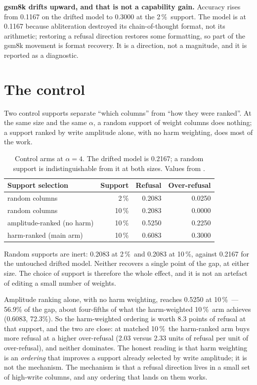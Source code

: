 \documentclass[11pt,a4paper]{article}
\newcommand{\file}[1]{\protect\path{#1}}
\newcommand{\pct}{\,\%}
\begin{document}
\textbf{gsm8k drifts upward, and that is not a capability gain.} Accuracy rises from 0.1167 on the drifted
model to 0.3000 at the 2\pct\ support. The model is at 0.1167 because abliteration destroyed its
chain-of-thought format, not its arithmetic; restoring a refusal direction restores some formatting, so
part of the gsm8k movement is format recovery. It is a direction, not a magnitude, and it is reported as a
diagnostic.

\section{The control}
\label{sec:control}

Two control supports separate ``which columns'' from ``how they were ranked''. At the same size and the
same $\alpha$, a random support of weight columns does nothing; a support ranked by write amplitude alone,
with no harm weighting, does most of the work.

\begin{table}[h]
\centering
\small
\caption{Control arms at $\alpha=4$. The drifted model is 0.2167; a random support is indistinguishable
from it at both sizes. Values from \file{results/p3c_blind.json}.}
\label{tab:control}
\begin{tabular}{@{}lrrr@{}}
\toprule
\textbf{Support selection} & \textbf{Support} & \textbf{Refusal} & \textbf{Over-refusal} \\
\midrule
random columns            & 2\pct  & 0.2083 & 0.0250 \\
random columns            & 10\pct & 0.2083 & 0.0000 \\
amplitude-ranked (no harm) & 10\pct & 0.5250 & 0.2250 \\
harm-ranked (main arm)     & 10\pct & 0.6083 & 0.3000 \\
\bottomrule
\end{tabular}
\end{table}

Random supports are inert: 0.2083 at 2\pct\ and 0.2083 at 10\pct, against 0.2167 for the untouched
drifted model. Neither recovers a single point of the gap, at either size. The choice of support is
therefore the whole effect, and it is not an artefact of editing a small number of weights.

Amplitude ranking alone, with no harm weighting, reaches 0.5250 at 10\pct\ --- 56.9\% of the gap, about
four-fifths of what the harm-weighted 10\pct\ arm achieves (0.6083, 72.3\%). So the harm-weighted ordering
is worth 8.3 points of refusal at that support, and the two are close: at matched 10\pct\ the harm-ranked
arm buys more refusal at a higher over-refusal (2.03 versus 2.33 units of refusal per unit of
over-refusal), and neither dominates. The honest reading is that harm weighting is an \emph{ordering} that
improves a support already selected by write amplitude; it is not the mechanism. The mechanism is that a
refusal direction lives in a small set of high-write columns, and any ordering that lands on them works.
\end{document}
